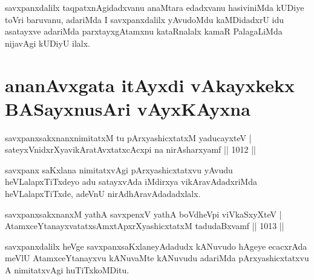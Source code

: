 \begin{artha}
savxpanxdalilx taqpatxnAgidadxvanu anaMtara edadxvanu hasiviniMda kUDiye toVri baruvanu, adariMda I savxpanxdalilx yAvudoMdu kaMDidadxrU idu asatayxve adariMda parxtayxgAtamxnu kataRnalalx kamaR PalagaLiMda nijavAgi kUDiyU ilalx.
\end{artha}

\section*{ananAvxgata itAyxdi vAkayxkekx BASayxnusAri vAyxKAyxna}


\begin{shl}
savxpanxsakxnanxnimitatxM tu \footnotemark[1]pArxyashicxtatxM yaducayxteV | \\
sateyxVnidxrXyavikAratAvxtatxcAcxpi na nirAsharxyamf \hfill||  1012 ||  
\end{shl}

\begin{artha}
savxpanx saKxlana nimitatxvAgi pArxyashicxtatxvu yAvudu heVLalapxTiTxdeyo adu satayxvAda iMdirxya vikAravAdadxriMda heVLalapxTiTxde, adeVnU nirAdhAravAdadadxlalx.
\end{artha}


\begin{shl}
savxpanxsakxnanxM yathA savxpenxV yathA boVdheV\s pi viVkaSxyXteV | \\
AtamxceYtanayxvatatxsAmxtApxrXyashicxtatxM tadudaBxvamf \hfill||  1013 || 
\end{shl}

\begin{artha}
savxpanxdalilx heVge savxpanxsaKxlaneyAdadudx kANuvudo hAgeye ecacxrAda meVlU AtamxceYtanayxvu kANuvaMte kANuvudu adariMda pArxyashicxtatxvu A nimitatxvAgi huTiTxkoMDitu.
\end{artha}


